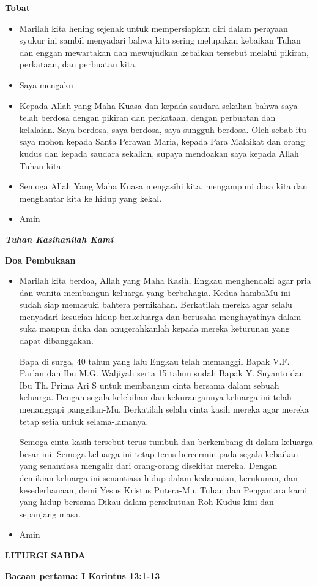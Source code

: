 \documentclass[10pt]{book}
\makeatletter
\newcommand{\judul}[1]{%
  {\parindent \z@ \centering \normalfont
    \interlinepenalty\@M \Large \bfseries #1\par\nobreak \vskip 20\p@ }}
\newcommand{\subjudul}[1]{%
  {\parindent \z@ \normalfont
    \interlinepenalty\@M \bfseries #1\par\nobreak \vskip 20\p@ }}
\newcommand{\lagu}[1]{%
  {\parindent \z@ \normalfont
    \interlinepenalty\@M \bfseries \emph{#1}\par\nobreak \vskip 20\p@ }}
\newcommand{\BU}[1]{\begin{itemize} \item[U:] #1 \end{itemize}}
\newcommand{\BI}[1]{\begin{itemize} \item[I:] #1 \end{itemize}}
\newcommand{\ultah}{40 }
\newcommand{\suami}{V.F. Parlan }
\newcommand{\istri}{M.G. Waljiyah }
\newcommand{\ultahdua}{15 }
\newcommand{\suamidua}{Y. Suyanto }
\newcommand{\istridua}{Th. Prima Ari S }
\makeatother
\begin{document}
\subjudul{Tobat}
\BI{Marilah kita hening sejenak untuk mempersiapkan diri dalam perayaan syukur ini sambil menyadari bahwa kita sering melupakan kebaikan Tuhan dan enggan mewartakan dan mewujudkan kebaikan tersebut melalui pikiran, perkataan, dan perbuatan kita.}

\BI{Saya mengaku}

\BU{Kepada Allah yang Maha Kuasa dan kepada saudara sekalian bahwa saya telah berdosa dengan pikiran dan perkataan, dengan perbuatan dan kelalaian. Saya berdosa, saya berdosa, saya sungguh berdosa. Oleh sebab itu saya mohon kepada Santa Perawan Maria, kepada Para Malaikat dan orang kudus dan kepada saudara sekalian, supaya mendoakan saya kepada Allah Tuhan kita.}

\BI{Semoga Allah Yang Maha Kuasa mengasihi kita, mengampuni dosa kita dan menghantar kita ke hidup yang kekal.}

\BU{Amin}

\lagu{Tuhan Kasihanilah Kami}

\subjudul{Doa Pembukaan}

\BI{Marilah kita berdoa,
Allah yang Maha Kasih, Engkau menghendaki agar pria dan wanita membangun keluarga yang berbahagia. Kedua hambaMu ini sudah siap memasuki bahtera pernikahan. Berkatilah mereka agar selalu menyadari kesucian hidup berkeluarga dan berusaha menghayatinya dalam suka maupun duka dan anugerahkanlah kepada mereka keturunan yang dapat dibanggakan.

Bapa di surga, \ultah tahun yang lalu Engkau telah memanggil Bapak \suami dan Ibu \istri serta \ultahdua tahun sudah Bapak \suamidua dan Ibu \istridua untuk membangun cinta bersama dalam sebuah keluarga. Dengan segala kelebihan dan kekurangannya keluarga ini telah menanggapi panggilan-Mu. Berkatilah selalu cinta kasih mereka agar mereka tetap setia untuk selama-lamanya.

Semoga cinta kasih tersebut terus tumbuh dan berkembang di dalam keluarga besar ini. Semoga keluarga ini tetap terus bercermin pada segala kebaikan yang senantiasa mengalir dari orang-orang disekitar mereka. Dengan demikian keluarga ini senantiasa hidup dalam kedamaian, kerukunan, dan kesederhanaan, demi Yesus Kristus Putera-Mu, Tuhan dan Pengantara kami yang hidup bersama Dikau dalam persekutuan Roh Kudus kini dan sepanjang masa.}

\BU{Amin}

\judul{LITURGI SABDA}

\subjudul{Bacaan pertama: I Korintus 13:1-13}
\end{document}
